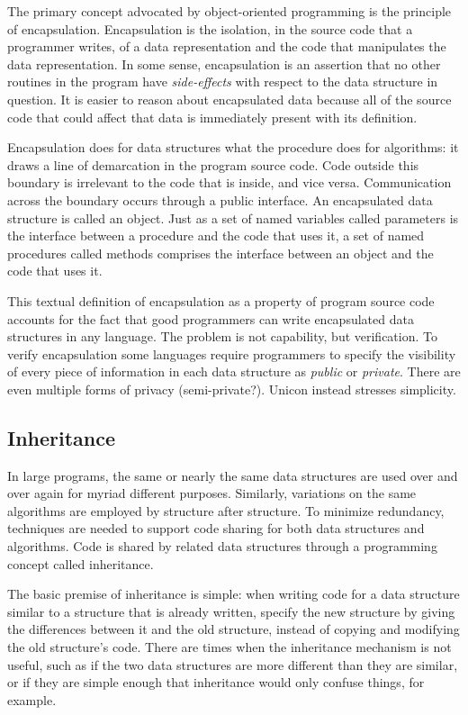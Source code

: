 The primary concept advocated by object-oriented programming is the
principle of encapsulation. Encapsulation is the
isolation, in the source code that a programmer writes, of a data
representation and the code that manipulates the data representation.
In some sense, encapsulation is an assertion that no other routines in
the program have {\em side-effects\/} with
respect to the data structure in question. It is easier to reason about
encapsulated data because all of the source code that could affect that
data is immediately present with its definition. 

Encapsulation does for data structures what the procedure does for
algorithms: it draws a line of demarcation in the program source code.
Code outside this boundary is irrelevant to
the code that is inside, and vice versa. Communication across the
boundary occurs through a public interface. An encapsulated
data structure is called an object. Just as a set of named variables called
parameters is the interface between a procedure and the
code that uses it, a set of named procedures called methods comprises
the interface between an object and the code that uses it. 

This textual definition of encapsulation as a property of program source
code accounts for the fact that good programmers can write encapsulated
data structures in any language. The problem is not capability, but
verification. To verify encapsulation some languages require
programmers to specify the visibility of every piece of information in
each data structure as {\em public\/} or
{\em private\/}. There are even multiple forms of
privacy (semi-private?). Unicon instead stresses simplicity. 

\subsection{Inheritance}

In large programs, the same or nearly the same data structures are used
over and over again for myriad different purposes. Similarly,
variations on the same algorithms are employed by structure after
structure. To minimize redundancy, techniques are needed to support
code sharing for both data structures and algorithms. Code is shared by
related data structures through a programming concept called
inheritance. 

The basic premise of inheritance is simple: when writing code for a data
structure similar to a structure that is already written,
specify the new structure by giving the differences between it and
the old structure, instead of copying and modifying the old
structure's code. There are times when the
inheritance mechanism is not useful, such as if the two data structures
are more different than they are similar, or if they are simple enough
that inheritance would only confuse things, for example. 

